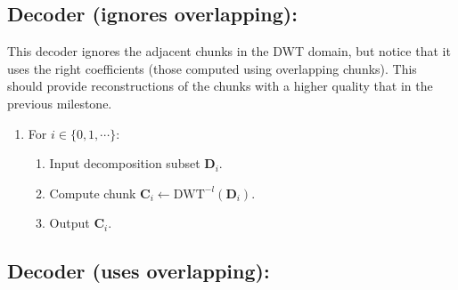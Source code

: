 
\subsection*{Decoder (ignores overlapping):}
This decoder ignores the adjacent chunks in the DWT domain, but notice that it uses the right coefficients (those computed using overlapping chunks). This should provide reconstructions of the chunks with a higher quality that in the previous milestone.
\begin{enumerate}
\item For $i\in\{0,1,\cdots\}$:
  \begin{enumerate}
  \item Input decomposition subset ${\mathbf D}_i$.
  \item Compute chunk ${\mathbf C}_i\leftarrow\text{DWT}^{-l}({\mathbf D}_i)$.
  \item Output ${\mathbf C}_i$.
  \end{enumerate}
\end{enumerate}

\subsection*{Decoder (uses overlapping):}

